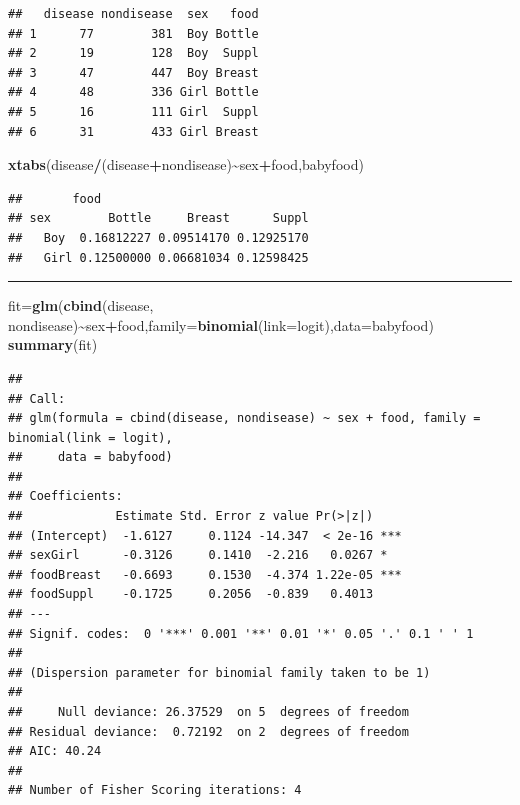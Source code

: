 \documentclass[
]{article}
\newenvironment{Shaded}{\begin{snugshade}}{\end{snugshade}}
\newcommand{\AttributeTok}[1]{\textcolor[rgb]{0.13,0.29,0.53}{#1}}
\newcommand{\FunctionTok}[1]{\textcolor[rgb]{0.13,0.29,0.53}{\textbf{#1}}}
\newcommand{\NormalTok}[1]{#1}
\newcommand{\OtherTok}[1]{\textcolor[rgb]{0.56,0.35,0.01}{#1}}
\newcommand{\SpecialCharTok}[1]{\textcolor[rgb]{0.81,0.36,0.00}{\textbf{#1}}}
\begin{document}
\begin{verbatim}
##   disease nondisease  sex   food
## 1      77        381  Boy Bottle
## 2      19        128  Boy  Suppl
## 3      47        447  Boy Breast
## 4      48        336 Girl Bottle
## 5      16        111 Girl  Suppl
## 6      31        433 Girl Breast
\end{verbatim}

\begin{Shaded}
\begin{Highlighting}[]
\FunctionTok{xtabs}\NormalTok{(disease}\SpecialCharTok{/}\NormalTok{(disease}\SpecialCharTok{+}\NormalTok{nondisease)}\SpecialCharTok{\textasciitilde{}}\NormalTok{sex}\SpecialCharTok{+}\NormalTok{food,babyfood)}
\end{Highlighting}
\end{Shaded}

\begin{verbatim}
##       food
## sex        Bottle     Breast      Suppl
##   Boy  0.16812227 0.09514170 0.12925170
##   Girl 0.12500000 0.06681034 0.12598425
\end{verbatim}

\begin{center}\rule{0.5\linewidth}{0.5pt}\end{center}

\footnotesize

\begin{Shaded}
\begin{Highlighting}[]
\NormalTok{fit}\OtherTok{=}\FunctionTok{glm}\NormalTok{(}\FunctionTok{cbind}\NormalTok{(disease, nondisease)}\SpecialCharTok{\textasciitilde{}}\NormalTok{sex}\SpecialCharTok{+}\NormalTok{food,}\AttributeTok{family=}\FunctionTok{binomial}\NormalTok{(}\AttributeTok{link=}\NormalTok{logit),}\AttributeTok{data=}\NormalTok{babyfood)}
\FunctionTok{summary}\NormalTok{(fit)}
\end{Highlighting}
\end{Shaded}

\begin{verbatim}
## 
## Call:
## glm(formula = cbind(disease, nondisease) ~ sex + food, family = binomial(link = logit), 
##     data = babyfood)
## 
## Coefficients:
##             Estimate Std. Error z value Pr(>|z|)    
## (Intercept)  -1.6127     0.1124 -14.347  < 2e-16 ***
## sexGirl      -0.3126     0.1410  -2.216   0.0267 *  
## foodBreast   -0.6693     0.1530  -4.374 1.22e-05 ***
## foodSuppl    -0.1725     0.2056  -0.839   0.4013    
## ---
## Signif. codes:  0 '***' 0.001 '**' 0.01 '*' 0.05 '.' 0.1 ' ' 1
## 
## (Dispersion parameter for binomial family taken to be 1)
## 
##     Null deviance: 26.37529  on 5  degrees of freedom
## Residual deviance:  0.72192  on 2  degrees of freedom
## AIC: 40.24
## 
## Number of Fisher Scoring iterations: 4
\end{verbatim}
\end{document}
